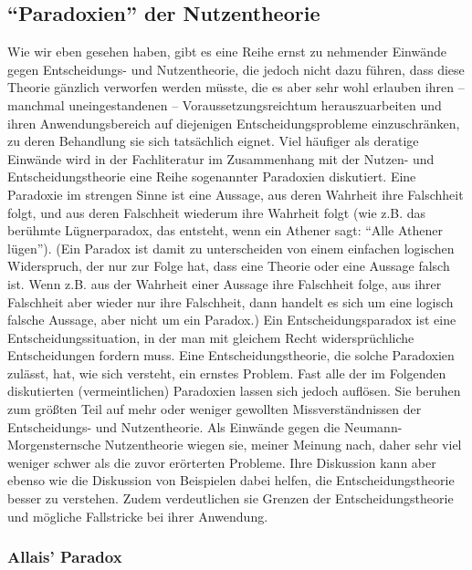 \subsection{"`Paradoxien"' der Nutzentheorie}

Wie wir eben gesehen haben, gibt es eine Reihe ernst zu nehmender Einwände gegen
Entscheidungs- und Nutzentheorie, die jedoch nicht dazu führen, dass diese
Theorie gänzlich verworfen werden müsste, die es aber sehr wohl erlauben ihren --
manchmal uneingestandenen -- Voraussetzungsreichtum herauszuarbeiten und ihren
Anwendungsbereich auf diejenigen Entscheidungsprobleme einzuschränken, zu deren
Behandlung sie sich tatsächlich eignet. Viel häufiger als deratige Einwände wird
in der Fachliteratur im Zusammenhang mit der Nutzen- und Entscheidungstheorie
eine Reihe sogenannter Paradoxien diskutiert. Eine Paradoxie im strengen Sinne
ist eine Aussage, aus deren Wahrheit ihre Falschheit folgt, und aus deren
Falschheit wiederum ihre Wahrheit folgt (wie z.B. das berühmte Lügnerparadox, das
entsteht, wenn ein Athener sagt: "`Alle Athener lügen"'). (Ein Paradox ist damit
zu unterscheiden von einem einfachen logischen Widerspruch, der nur zur Folge
hat, dass eine Theorie oder eine Aussage falsch ist. Wenn z.B. aus der Wahrheit
einer Aussage ihre Falschheit folge, aus ihrer Falschheit aber wieder nur ihre
Falschheit, dann handelt es sich um eine logisch falsche Aussage, aber nicht um
ein Paradox.) Ein Entscheidungsparadox ist eine Entscheidungssituation,
 in der man mit gleichem
Recht widersprüchliche Entscheidungen fordern muss. Eine Entscheidungstheorie,
die solche Paradoxien zulässt, hat, wie sich versteht, ein ernstes Problem. Fast
alle der im Folgenden diskutierten (vermeintlichen) Paradoxien lassen sich jedoch
auflösen. Sie beruhen zum größten Teil auf mehr oder weniger gewollten
Missverständnissen der Entscheidungs- und Nutzentheorie. Als Einwände gegen die
Neumann-Morgensternsche Nutzentheorie wiegen sie, meiner Meinung nach, daher sehr
viel weniger schwer als die zuvor erörterten Probleme. Ihre Diskussion kann aber
ebenso wie die Diskussion von Beispielen dabei helfen, die Entscheidungstheorie
besser zu verstehen. Zudem verdeutlichen sie Grenzen der Entscheidungstheorie und
mögliche Fallstricke bei ihrer Anwendung.

\subsubsection{Allais' Paradox}

